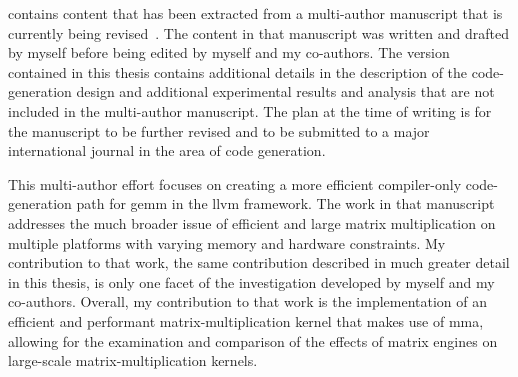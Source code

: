 \documentclass[\main/thesis.tex]{subfiles}
\begin{document}
\begin{preface}

 contains content that has been extracted from a multi-author manuscript that is currently being revised~\autocite{kuzma2021fast}.
The content in that manuscript was written and drafted by myself before being edited by myself and my co-authors.
The version contained in this thesis contains additional details in the description of the code-generation design and additional experimental results and analysis that are not included in the multi-author manuscript.
The plan at the time of writing is for the manuscript to be further revised and to be submitted to a major international journal in the area of code generation.

This multi-author effort focuses on creating a more efficient compiler-only code-generation path for \gls{gemm} in the \gls{llvm} framework.
The work in that manuscript addresses the much broader issue of efficient and large matrix multiplication on multiple platforms with varying memory and hardware constraints.
My contribution to that work, the same contribution described in much greater detail in this thesis, is only one facet of the investigation developed by myself and my co-authors.
Overall, my contribution to that work is the implementation of an efficient and performant matrix-multiplication kernel that makes use of \gls{mma}, allowing for the examination and comparison of the effects of \glspl{matrix engine} on large-scale matrix-multiplication kernels.

%
%
\end{preface}
\end{document}
